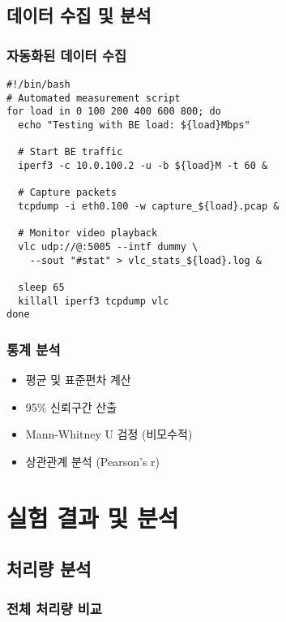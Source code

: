 \documentclass[10pt,twocolumn]{IEEEtran}
\begin{document}
\subsection{데이터 수집 및 분석}

\subsubsection{자동화된 데이터 수집}
\begin{verbatim}
#!/bin/bash
# Automated measurement script
for load in 0 100 200 400 600 800; do
  echo "Testing with BE load: ${load}Mbps"
  
  # Start BE traffic
  iperf3 -c 10.0.100.2 -u -b ${load}M -t 60 &
  
  # Capture packets
  tcpdump -i eth0.100 -w capture_${load}.pcap &
  
  # Monitor video playback
  vlc udp://@:5005 --intf dummy \
    --sout "#stat" > vlc_stats_${load}.log &
  
  sleep 65
  killall iperf3 tcpdump vlc
done
\end{verbatim}

\subsubsection{통계 분석}
\begin{itemize}
\item 평균 및 표준편차 계산
\item 95\% 신뢰구간 산출
\item Mann-Whitney U 검정 (비모수적)
\item 상관관계 분석 (Pearson's r)
\end{itemize}

\section{실험 결과 및 분석}

\subsection{처리량 분석}

\subsubsection{전체 처리량 비교}
\end{document}
